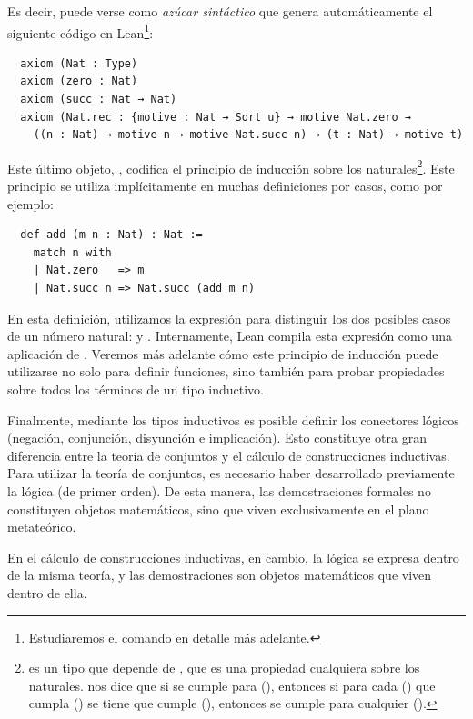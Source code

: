 Es decir,  puede verse como \textit{azúcar sintáctico} que genera automáticamente el siguiente código en Lean\footnote{Estudiaremos el comando  en detalle más adelante.}:

\begin{lstlisting}
  axiom (Nat : Type)
  axiom (zero : Nat)
  axiom (succ : Nat → Nat)
  axiom (Nat.rec : {motive : Nat → Sort u} → motive Nat.zero →
    ((n : Nat) → motive n → motive Nat.succ n) → (t : Nat) → motive t)
\end{lstlisting}

Este último objeto, , codifica el principio de inducción sobre los naturales\footnote{ es un tipo que depende de , que es una propiedad cualquiera sobre los naturales.  nos dice que si se cumple  para  (), entonces si para cada  () que cumpla  () se tiene que  cumple  (), entonces se cumple  para cualquier  ().}. Este principio se utiliza implícitamente en muchas definiciones por casos, como por ejemplo:

\begin{lstlisting}
  def add (m n : Nat) : Nat :=
    match n with
    | Nat.zero   => m
    | Nat.succ n => Nat.succ (add m n)
\end{lstlisting}

En esta definición, utilizamos la expresión  para distinguir los dos posibles casos de un número natural:  y . Internamente, Lean compila esta expresión como una aplicación de . Veremos más adelante cómo este principio de inducción puede utilizarse no solo para definir funciones, sino también para probar propiedades sobre todos los términos de un tipo inductivo.

Finalmente, mediante los tipos inductivos es posible definir los conectores lógicos (negación, conjunción, disyunción e implicación). Esto constituye otra gran diferencia entre la teoría de conjuntos y el cálculo de construcciones inductivas. Para utilizar la teoría de conjuntos, es necesario haber desarrollado previamente la lógica (de primer orden). De esta manera, las demostraciones formales no constituyen objetos matemáticos, sino que viven exclusivamente en el plano metateórico.

En el cálculo de construcciones inductivas, en cambio, la lógica se expresa dentro de la misma teoría, y las demostraciones son objetos matemáticos que viven dentro de ella.

